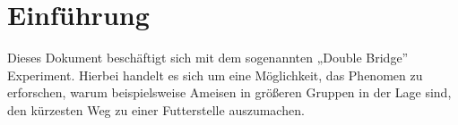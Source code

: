 
\section{Einführung}

Dieses Dokument beschäftigt sich mit dem sogenannten „Double Bridge”
Experiment. Hierbei handelt es sich um eine Möglichkeit, das Phenomen
zu erforschen, warum beispielsweise Ameisen in größeren Gruppen in der
Lage sind, den kürzesten Weg zu einer Futterstelle auszumachen.
